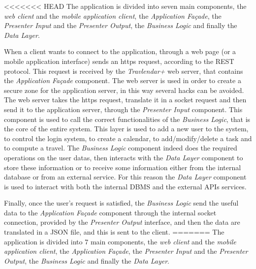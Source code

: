 <<<<<<< HEAD
The application is divided into seven main components, the \emph{web client} and the \emph{mobile application client}, the \emph{Application Façade}, the \emph{Presenter Input} and the \emph{Presenter Output}, the \emph{Business Logic} and finally the \emph{Data Layer}.

When a client wants to connect to the application, through a web page (or a mobile application interface) sends an https request, according to the REST protocol. This request is received by the \emph{Travlendar+} web server, that contains the \emph{Application Façade} component. The web server is used in order to create a secure zone for the application server, in this way several hacks can be avoided. The web server takes the https request, translate it in a socket request and then send it to the application server, through the \emph{Presenter Input} component. This component is used to call the correct functionalities of the \emph{Business Logic}, that is the core of the entire system. This layer is used to add a new user to the system, to control the login system, to create a calendar, to add/modify/delete a task and to compute a travel. The \emph{Business Logic} component indeed does the required operations on the user datas, then interacts with the \emph{Data Layer} component to store these information or to receive some information either from the internal database or from an external service. For this reason the \emph{Data Layer} component is used to interact with both the internal DBMS and the external APIs services.

Finally, once the user's request is satisfied, the \emph{Business Logic} send the useful data to the \emph{Application Façade} component through the internal socket connection, provided by the \emph{Presenter Output} interface, and then the data are translated in a JSON file, and this is sent to the client.
=======
The application is divided into 7 main components, the \emph{web client} and the \emph{mobile application client}, the \emph{Application Façade}, the \emph{Presenter Input} and the \emph{Presenter Output}, the \emph{Business Logic} and finally the \emph{Data Layer}.

